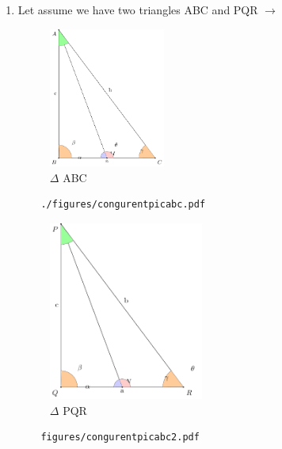 \begin{enumerate}
		
		\item Let assume we have two triangles ABC and PQR $\to$\\	
		\begin{figure}[!htb]
			\centering
			\includegraphics[width=1.5in]{./figures/congurentpicabc.pdf}
			\caption{$\Delta$ ABC}
			\label{fig:triangle}
		\end{figure}
		
		\begin{lstlisting}
	./figures/congurentpicabc.pdf
		\end{lstlisting}
		
		
		
		
		
		\begin{figure}[!htb]
			\centering
			\includegraphics[width=2.0in]{./figures/congurentpicabc2.pdf}
			\caption{$\Delta$ PQR }
			\label{fig:triangle2}
		\end{figure}
	\begin{lstlisting}
    figures/congurentpicabc2.pdf
	\end{lstlisting}
		

\end{enumerate}

